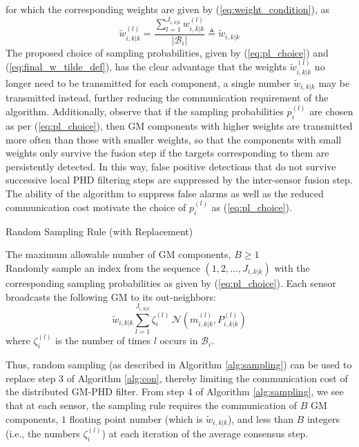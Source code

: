 for which the corresponding weights are given by (\ref{eq:weight_condition}), as
\begin{equation}
\tilde w^{(l)}_{i,k|k} = \frac{\sum_{l=1}^{J_{i,k|k}} w^{(l)}_{i,k|k}}{|\mathcal B_i|} \triangleq \tilde w_{i,k|k}
\label{eq:final_w_tilde_def}
\end{equation}
The proposed choice of sampling probabilities, given by (\ref{eq:pl_choice}) and (\ref{eq:final_w_tilde_def}), has the clear advantage that the weights $\tilde w^{(l)}_{i,k|k}$ no longer need to be transmitted for each component, a single number $\tilde w_{i,k|k}$ may be transmitted instead, further reducing the communication requirement of the algorithm. Additionally, observe that if the sampling probabilities $p_{i}^{(l)}$ are chosen as per (\ref{eq:pl_choice}), then GM components with higher weights are transmitted more often than those with smaller weights,
so that the components with small weights only survive the fusion step if the targets corresponding to them are persistently detected. In this way, false positive detections that do not survive successive local PHD filtering steps are suppressed by the inter-sensor fusion step. The ability of the algorithm to suppress false alarms as well as the reduced communication cost motivate the choice of $p_{i}^{(l)}$ as (\ref{eq:pl_choice}).

\begin{algorithm}
\caption{Random Sampling Rule (with Replacement)}
\begin{algorithmic}[1]
\vspace{2pt}
\REQUIRE The maximum allowable number of GM components, $B\geq 1$ \\
\vspace{3pt} 
\STATE Randomly sample an index from the sequence $\left(1, 2, \dots, J_{i,k|k}\right)$ with the corresponding sampling probabilities as given by (\ref{eq:pl_choice}).
\ENDWHILE
\STATE Each sensor broadcasts the following GM to its out-neighbors:
\[\tilde w_{i,k|k} \sum_{l=1}^{J_{i,k|k}}\zeta^{(l)}_{i} \hspace{2pt} \mathcal N(m^{(l)}_{i,k|k}, P^{(l)}_{i,k|k})
\]
where $\zeta^{(l)}_i$ is the number of times $l$ occurs in $\mathcal B_i$.
\end{algorithmic}
\label{alg:sampling}
\end{algorithm}
Thus, random sampling (as described in Algorithm \ref{alg:sampling}) can be used to replace step $3$ of Algorithm \ref{alg:con}, thereby limiting the communication cost of the distributed GM-PHD filter. From step $4$ of Algorithm \ref{alg:sampling}, we see that at each sensor, the sampling rule requires the  communication of $B$ GM components, $1$ floating point number (which is $\tilde w_{i,k|k}$), and less than $B$ integers (i.e., the numbers $\zeta_i^{(l)}$) at each iteration of the average consensus step.


